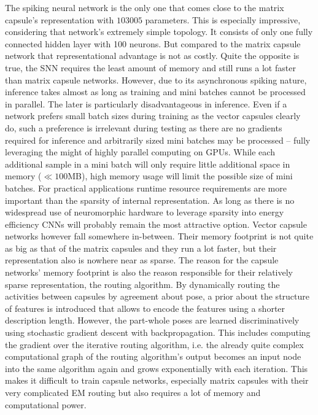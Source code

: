 The spiking neural network is the only one that comes close to the matrix capsule’s representation with $\num{103005}$ parameters. This is especially impressive, considering that network’s extremely simple topology. It consists of only one fully connected hidden layer with 100 neurons. But compared to the matrix capsule network that representational advantage is not as costly. Quite the opposite is true, the SNN requires the least amount of memory and still runs a lot faster than matrix capsule networks. However, due to its asynchronous spiking nature, inference takes almost as long as training and mini batches cannot be processed in parallel. The later is particularly disadvantageous in inference. Even if a network prefers small batch sizes during training as the vector capsules clearly do, such a preference is irrelevant during testing as there are no gradients required for inference and arbitrarily sized mini batches may be processed – fully leveraging the might of highly parallel computing on GPUs. While each additional sample in a mini batch will only require little additional space in memory ($\ll \num{100}$MB), high memory usage will limit the possible size of mini batches. For practical applications runtime resource requirements are more important than the sparsity of internal representation. As long as there is no widespread use of neuromorphic hardware to leverage sparsity into energy efficiency CNNs will probably remain the most attractive option. Vector capsule networks however fall somewhere in-between. Their memory footprint is not quite as big as that of the matrix capsules and they run a lot faster, but their representation also is nowhere near as sparse. The reason for the capsule networks’ memory footprint is also the reason responsible for their relatively sparse representation, the routing algorithm. By dynamically routing the activities between capsules by agreement about pose, a prior about the structure of features is introduced that allows to encode the features using a shorter description length. However, the part-whole poses are learned discriminatively using stochastic gradient descent with backpropagation. This includes computing the gradient over the iterative routing algorithm, i.e. the already quite complex computational graph of the routing algorithm’s output becomes an input node into the same algorithm again and grows exponentially with each iteration. This makes it difficult to train capsule networks, especially matrix capsules with their very complicated EM routing but also requires a lot of memory and computational power.
